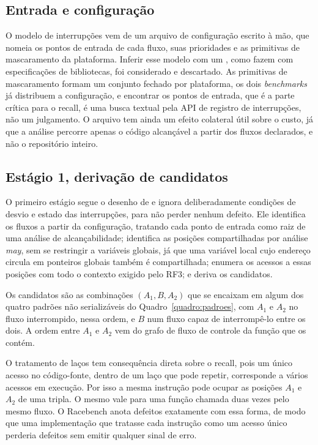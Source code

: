 \subsection{Entrada e configuração}

O modelo de interrupções vem de um arquivo de configuração escrito à mão, que
nomeia os pontos de entrada de cada fluxo, suas prioridades e as primitivas de
mascaramento da plataforma. Inferir esse modelo com um \llm, como
 fazem com especificações de bibliotecas, foi considerado e
descartado. As primitivas de mascaramento formam um conjunto fechado por
plataforma, os dois \textit{benchmarks} já distribuem a configuração, e
encontrar os pontos de entrada, que é a parte crítica para o recall, é uma
busca textual pela API de registro de interrupções, não um julgamento. O
arquivo tem ainda um efeito colateral útil sobre o custo, já que a análise
percorre apenas o código alcançável a partir dos fluxos declarados, e não o
repositório inteiro.

\subsection{Estágio 1, derivação de candidatos}

O primeiro estágio segue o desenho de  e ignora
deliberadamente condições de desvio e estado das interrupções, para não perder nenhum defeito.
Ele identifica os fluxos a partir da configuração, tratando cada ponto de
entrada como raiz de uma análise de alcançabilidade; identifica as posições
compartilhadas por análise \textit{may}, sem se restringir a variáveis globais,
já que uma variável local cujo endereço circula em ponteiros globais também é
compartilhada; enumera os acessos a essas posições com todo o contexto exigido
pelo RF3; e deriva os candidatos.

Os candidatos são as combinações $(A_1, B, A_2)$ que se encaixam em algum dos
quatro padrões não serializáveis do Quadro~\ref{quadro:padroes}, com $A_1$ e
$A_2$ no fluxo interrompido, nessa ordem, e $B$ num fluxo capaz de interrompê-lo
entre os dois. A ordem entre $A_1$ e $A_2$ vem do grafo de fluxo de controle da
função que os contém.

O tratamento de laços tem consequência direta sobre o recall, pois um único
acesso no código-fonte, dentro de um laço que pode repetir, corresponde a
vários acessos em execução. Por isso a mesma instrução pode ocupar as posições $A_1$ e $A_2$
de uma tripla. O mesmo vale para uma função chamada duas vezes pelo mesmo
fluxo. O Racebench anota defeitos exatamente com essa forma, de modo que uma
implementação que tratasse cada instrução como um acesso único perderia
defeitos sem emitir qualquer sinal de erro.

